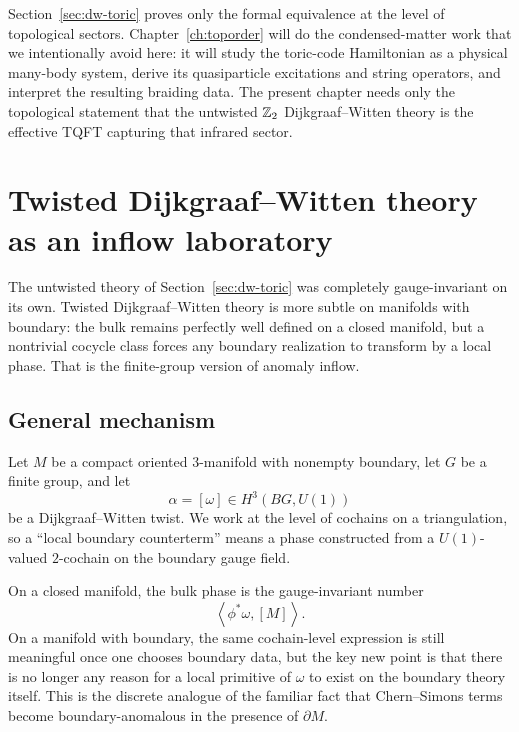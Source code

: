 \begin{remark}\label{rem:dw-toric-scope}
Section~\ref{sec:dw-toric} proves only the formal equivalence at the level of topological sectors. Chapter~\ref{ch:toporder} will do the condensed-matter work that we intentionally avoid here: it will study the toric-code Hamiltonian as a physical many-body system, derive its quasiparticle excitations and string operators, and interpret the resulting braiding data. The present chapter needs only the topological statement that the untwisted $\mathbb{Z}_2$ Dijkgraaf--Witten theory is the effective TQFT capturing that infrared sector.
\end{remark}

\section{Twisted Dijkgraaf--Witten theory as an inflow laboratory}\label{sec:dw-inflow}

The untwisted theory of Section~\ref{sec:dw-toric} was completely gauge-invariant on its own. Twisted Dijkgraaf--Witten theory is more subtle on manifolds with boundary: the bulk remains perfectly well defined on a closed manifold, but a nontrivial cocycle class forces any boundary realization to transform by a local phase. That is the finite-group version of anomaly inflow.

\subsection{General mechanism}

\begin{assumption}\label{ass:dw-boundary}
Let $M$ be a compact oriented $3$-manifold with nonempty boundary, let $G$ be a finite group, and let
\begin{equation*}
\alpha=[\omega]\in H^3(BG,U(1))
\end{equation*}
be a Dijkgraaf--Witten twist. We work at the level of cochains on a triangulation, so a ``local boundary counterterm'' means a phase constructed from a $U(1)$-valued $2$-cochain on the boundary gauge field.
\end{assumption}

\noindent On a closed manifold, the bulk phase is the gauge-invariant number
\begin{equation*}
\left\langle \phi^*\omega,[M]\right\rangle.
\end{equation*}
On a manifold with boundary, the same cochain-level expression is still meaningful once one chooses boundary data, but the key new point is that there is no longer any reason for a local primitive of $\omega$ to exist on the boundary theory itself. This is the discrete analogue of the familiar fact that Chern--Simons terms become boundary-anomalous in the presence of $\partial M$.


